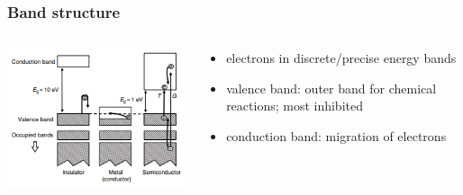 \documentclass[aspectratio=1610, 12pt]{beamer}
\begin{document}
\begin{frame}\frametitle{Band structure}
  \begin{columns}
    \begin{column}[c]{0.48\textwidth}
      \includegraphics[width=\textwidth]{plots/bands.png}
    \end{column}
    \begin{column}[c]{0.48\textwidth}
      \begin{itemize}
        \item electrons in discrete/precise energy bands
        \item valence band: outer band for chemical reactions; most inhibited
        \item conduction band: migration of electrons
      \end{itemize}
    \end{column}
  \end{columns}
\end{frame}
\end{document}
